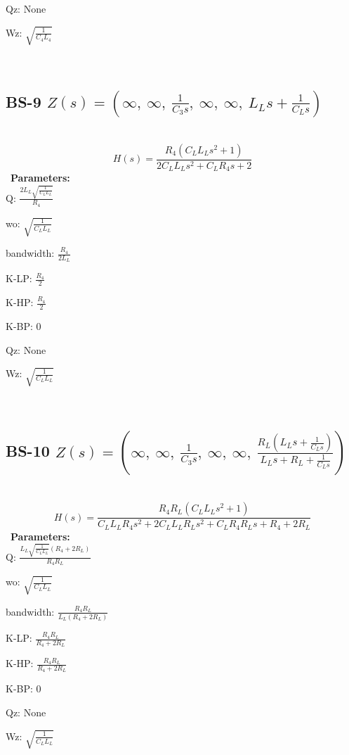 \documentclass{article}
\begin{document}
Qz: $\text{None}$\ 

Wz: $\sqrt{\frac{1}{C_{4} L_{4}}}$\ 

\ 

\subsection{BS-9 $Z(s) = \left( \infty, \  \infty, \  \frac{1}{C_{3} s}, \  \infty, \  \infty, \  L_{L} s + \frac{1}{C_{L} s}\right)$ } \ 
\textbf{\[H(s) = \frac{R_{4} \left(C_{L} L_{L} s^{2} + 1\right)}{2 C_{L} L_{L} s^{2} + C_{L} R_{4} s + 2}\] } \ 
\textbf{Parameters:}\\ 

Q: $\frac{2 L_{L} \sqrt{\frac{1}{C_{L} L_{L}}}}{R_{4}}$\ 

wo: $\sqrt{\frac{1}{C_{L} L_{L}}}$\ 

bandwidth: $\frac{R_{4}}{2 L_{L}}$\ 

K-LP: $\frac{R_{4}}{2}$\ 

K-HP: $\frac{R_{4}}{2}$\ 

K-BP: $0$\ 

Qz: $\text{None}$\ 

Wz: $\sqrt{\frac{1}{C_{L} L_{L}}}$\ 

\ 

\subsection{BS-10 $Z(s) = \left( \infty, \  \infty, \  \frac{1}{C_{3} s}, \  \infty, \  \infty, \  \frac{R_{L} \left(L_{L} s + \frac{1}{C_{L} s}\right)}{L_{L} s + R_{L} + \frac{1}{C_{L} s}}\right)$ } \ 
\textbf{\[H(s) = \frac{R_{4} R_{L} \left(C_{L} L_{L} s^{2} + 1\right)}{C_{L} L_{L} R_{4} s^{2} + 2 C_{L} L_{L} R_{L} s^{2} + C_{L} R_{4} R_{L} s + R_{4} + 2 R_{L}}\] } \ 
\textbf{Parameters:}\\ 

Q: $\frac{L_{L} \sqrt{\frac{1}{C_{L} L_{L}}} \left(R_{4} + 2 R_{L}\right)}{R_{4} R_{L}}$\ 

wo: $\sqrt{\frac{1}{C_{L} L_{L}}}$\ 

bandwidth: $\frac{R_{4} R_{L}}{L_{L} \left(R_{4} + 2 R_{L}\right)}$\ 

K-LP: $\frac{R_{4} R_{L}}{R_{4} + 2 R_{L}}$\ 

K-HP: $\frac{R_{4} R_{L}}{R_{4} + 2 R_{L}}$\ 

K-BP: $0$\ 

Qz: $\text{None}$\ 

Wz: $\sqrt{\frac{1}{C_{L} L_{L}}}$\ 
\end{document}
